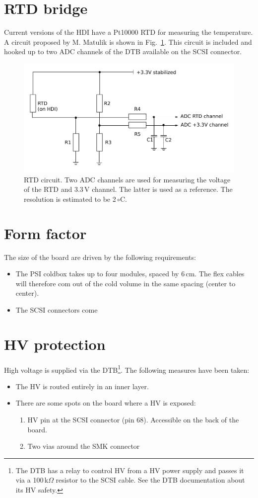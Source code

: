 \section{RTD bridge}
Current versions of the HDI have a Pt10000 RTD for measuring the temperature. A circuit proposed by M. Matulik is shown in Fig.~\ref{fig:RTDcircuit}. This circuit is included and hooked up to two ADC channels of the DTB available on the SCSI connector.

\begin{figure}[hbtp]
	\begin{center}
	\includegraphics[width=.3\textwidth]{img/RTDcircuit.pdf}
	\end{center}
	\caption{RTD circuit. Two ADC channels are used for measuring the voltage of the RTD and 3.3\,V channel. The latter is used as a reference. The resolution is estimated to be 2\,$\circ$C.}
	\label{fig:RTDcircuit}
\end{figure}


\section{Form factor}

The size of the board are driven by the following requirements:
\begin{itemize}
    \item The PSI coldbox takes up to four modules, spaced by 6\,cm. The flex cables will therefore com out of the cold volume in the same spacing (center to center).
    \item The SCSI connectors come 
\end{itemize}

\section{HV protection}
High voltage is supplied via the DTB\footnote{The DTB has a relay to control HV from a HV power supply and passes it via a 100\,k$\Omega$ resistor to the SCSI cable. See the DTB documentation about its HV safety.}. The following measures have been taken:
\begin{itemize}
    \item The HV is routed entirely in an inner layer.
    \item There are some spots on the board where a HV is exposed:
    \begin{enumerate}
	\item HV pin at the SCSI connector (pin 68). Accessible on the back of the board.
	\item Two vias around the SMK connector
    \end{enumerate}
\end{itemize}


